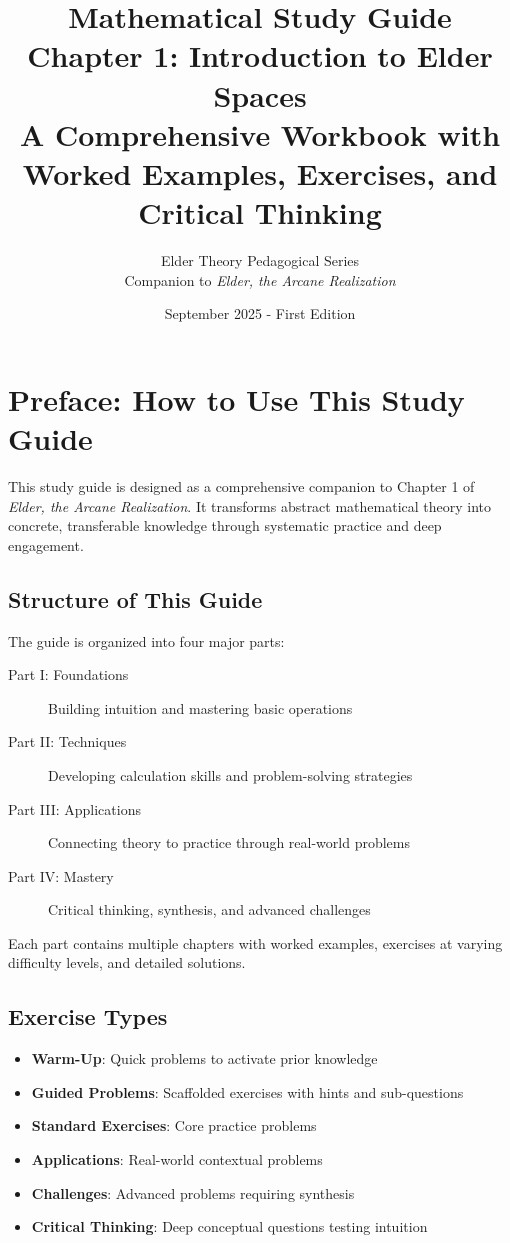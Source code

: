 \documentclass[12pt,a4paper]{book}
\title{\textbf{Mathematical Study Guide}\\
\LARGE{Chapter 1: Introduction to Elder Spaces}\\
\vspace{0.5cm}
\Large{A Comprehensive Workbook with}\\
\Large{Worked Examples, Exercises, and Critical Thinking}}
\author{Elder Theory Pedagogical Series\\
\vspace{0.3cm}
\large{Companion to \textit{Elder, the Arcane Realization}}}
\date{September 2025 - First Edition}
\theoremstyle{definition}
\theoremstyle{remark}
\begin{document}
\frontmatter
\maketitle

\chapter*{Preface: How to Use This Study Guide}

This study guide is designed as a comprehensive companion to Chapter 1 of \textit{Elder, the Arcane Realization}. It transforms abstract mathematical theory into concrete, transferable knowledge through systematic practice and deep engagement.

\section*{Structure of This Guide}

The guide is organized into four major parts:

\begin{description}
\item[Part I: Foundations] Building intuition and mastering basic operations
\item[Part II: Techniques] Developing calculation skills and problem-solving strategies
\item[Part III: Applications] Connecting theory to practice through real-world problems
\item[Part IV: Mastery] Critical thinking, synthesis, and advanced challenges
\end{description}

Each part contains multiple chapters with worked examples, exercises at varying difficulty levels, and detailed solutions.

\section*{Exercise Types}

\begin{itemize}
\item \textbf{Warm-Up}: Quick problems to activate prior knowledge
\item \textbf{Guided Problems}: Scaffolded exercises with hints and sub-questions
\item \textbf{Standard Exercises}: Core practice problems
\item \textbf{Applications}: Real-world contextual problems
\item \textbf{Challenges}: Advanced problems requiring synthesis
\item \textbf{Critical Thinking}: Deep conceptual questions testing intuition
\end{itemize}
\end{document}

